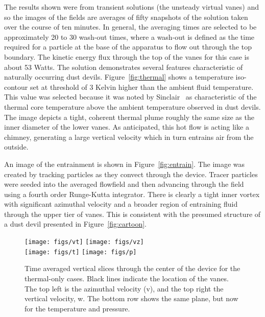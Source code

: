 The results shown were from transient solutions (the unsteady virtual
vanes) and so the images of the fields are averages of fifty snapshots
of the solution taken over the course of ten minutes. In general, the
averaging times are selected to be approximately 20 to 30 wash-out
times, where a wash-out is defined as the time required for a particle
at the base of the apparatus to flow out through the top boundary. The
kinetic energy flux through the top of the vanes for this case is about
53 Watts. The solution demonstrates several features characteristic of
naturally occurring dust devils. Figure~\ref{fig:thermal} shows a
temperature iso-contour set at threshold of 3 Kelvin higher than the
ambient fluid temperature. This value was selected because it was noted
by Sinclair~\cite{Sinclair1969} as characteristic of the thermal core 
temperature above the ambient temperature observed in dust devils. The
image depicts a tight, coherent thermal plume roughly the same size as
the inner diameter of the lower vanes. As anticipated, this hot flow is
acting like a chimney, generating a large vertical velocity which in
turn entrains air from the outside.  

An image of the entrainment is shown in Figure~\ref{fig:entrain}. The
image was created by tracking particles as they convect through the
device. Tracer particles were seeded into the averaged flowfield and
then advancing through the field using a fourth order Runge-Kutta integrator.  
There is clearly a tight inner vortex with significant azimuthal
velocity and a broader region of entraining fluid through the upper tier
of vanes. This is consistent with the presumed structure of a dust devil
presented in Figure~\ref{fig:cartoon}. 

\begin{figure}[htb]

 \centering
 \texttt{[image: figs/vt]}
 \hfill
  \texttt{[image: figs/vz]}
 \\
  \centering
  \texttt{[image: figs/t]}
 \hfill
 \texttt{[image: figs/p]}
 \caption{Time averaged vertical slices through the center of the device
 for the thermal-only cases. Black lines indicate the location of the
 vanes. The top left is the azimuthal velocity (v), and the top right
 the vertical velocity, w. The bottom row shows the same plane, but now for the
 temperature and pressure.} 
 \label{fig:to-vert}
\end{figure}

